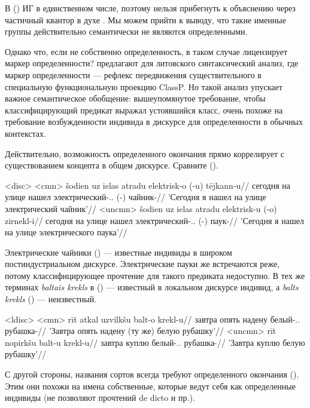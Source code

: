 \documentclass[a4paper, 12pt]{article}
\begin{document}
В () ИГ в единственном числе, поэтому нельзя прибегнуть к объяснению через частичный квантор в духе \citep{matt2023}. Мы можем прийти к выводу, что такие именные группы действительно семантически не являются определенными.

Однако что, если не собственно определенность, в таком случае лицензирует маркер определенности? \citep{rutpro2006} предлагают для литовского синтаксический анализ, где маркер определенности --- рефлекс передвижения существительного в специальную функциональную проекцию ClassP. Но такой анализ упускает важное семантическое обобщение: вышеупомянутое требование, чтобы классифицирующий предикат выражал устоявшийся класс, очень похоже на требование возбужденности индивида в дискурсе для определенности в обычных контекстах.

Действительно, возможность определенного окончания прямо коррелирует с существованием концепта в общем дискурсе. Сравните (\nextx).

\pex<disc>
    \a<cmn> \begingl
        \gla šodien uz ielas atradu elektrisk-o (\judge{*}-u) tējkann-u//
        \glb сегодня на улице нашел электрический-\M.\Def.\Acc{} (-\Indef) чайник-\Acc{}//
        \glft 'Сегодня я нашел на улице электрический чайник'//
    \endgl
    \a<uncmn> \begingl
    \gla šodien uz ielas atradu elektrisk-u (\judge{*}-o) zirnekl-i//
    \glb сегодня на улице нашел электрический-\M.\Indef.\Acc{} (-\Def) паук-\Acc{}//
    \glft 'Сегодня я нашел на улице электрического паука'//
\endgl
\xe

Электрические чайники () --- известные индивиды в широком постиндустриальном дискурсе. Электрические пауки же встречаются реже, потому классифицирующее прочтение для такого предиката недоступно. В тех же терминах \textit{baltais krekls} в () --- известный в локальном дискурсе индивид, а \textit{balts krekls} () --- неизвестный.

\pex<ldisc>
    \a<cmn> \begingl
        \gla rīt atkal uzvilkšu balt-o krekl-u//
        \glb завтра опять надену белый-\M.\Def.\Acc{} рубашка-\Acc{}//
        \glft 'Завтра опять надену (ту же) белую рубашку'//
    \endgl
    \a<uncmn> \begingl
        \gla rīt nopirkšu balt-u krekl-u//
        \glb завтра куплю белый-\M.\Indef.\Acc{} рубашка-\Acc{}//
        \glft 'Завтра куплю белую рубашку'//
    \endgl
\xe

С другой стороны, названия сортов всегда требуют определенного окончания (\nextx). Этим они похожи на имена собственные, которые ведут себя как определенные индивиды (не позволяют прочтений de dicto и пр.).
\end{document}

